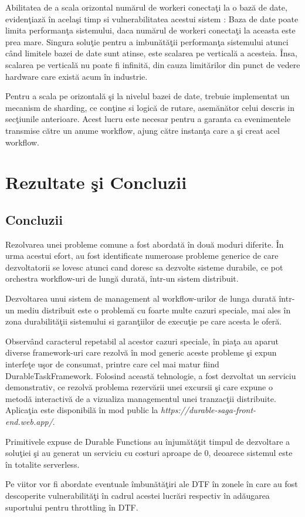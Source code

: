 \par Abilitatea de a scala orizontal numărul de workeri conectaţi la o bază de date, evidenţiază în acelaşi timp si vulnerabilitatea acestui sistem : Baza de date poate limita performanţa sistemului, daca numărul de workeri conectaţi la aceasta este prea mare. Singura soluţie pentru a imbunătăţii performanţa sistemului atunci când limitele bazei de date sunt atinse, este scalarea pe verticală a acesteia. Însa, scalarea pe verticală nu poate fi infinită, din cauza limitărilor din punct de vedere hardware care există acum în industrie. 
\par Pentru a scala pe orizontală şi la nivelul bazei de date, trebuie implementat un mecanism de sharding, ce conţine si logică de rutare, asemănător celui descris in secţiunile anterioare. Acest lucru este necesar pentru a garanta ca evenimentele transmise către un anume workflow, ajung către instanţa care a şi creat acel workflow. 
\chapter {Rezultate şi Concluzii}

\section{Concluzii}
\quad Rezolvarea unei probleme comune a fost abordată în două moduri diferite. În urma acestui efort, au fost identificate numeroase probleme generice de care dezvoltatorii se lovesc atunci cand doresc sa dezvolte sisteme durabile, ce pot orchestra workflow-uri de lungă durată, într-un sistem distribuit. 
\par Dezvoltarea unui sistem de management al workflow-urilor de lunga durată într-un mediu distribuit este o problemă cu foarte multe cazuri speciale, mai ales în zona durabilităţii sistemului si garanţiilor de execuţie pe care acesta le oferă. 
\par Observând caracterul repetabil al acestor cazuri speciale, în piaţa au aparut diverse framework-uri care rezolvă în mod generic aceste probleme şi expun interfeţe uşor de consumat, printre care cel mai matur fiind DurableTaskFramework. Folosind această tehnologie, a fost dezvoltat un serviciu demonstrativ, ce rezolvă problema rezervării unei excursii şi care expune o metodă interactivă de a vizualiza managementul unei tranzacţii distribuite. Aplicaţia este disponibilă în mod public la \emph{https://durable-saga-front-end.web.app/}. 
\par Primitivele expuse de Durable Functions au înjumătăţit timpul de dezvoltare a soluţiei şi au generat un serviciu cu costuri aproape de 0, deoarece sistemul este în totalite serverless. 
\par Pe viitor vor fi abordate eventuale îmbunătăţiri ale DTF în zonele în care au fost descoperite vulnerabilităţi în cadrul acestei lucrări respectiv în adăugarea suportului pentru throttling în DTF.


\listoffigures

